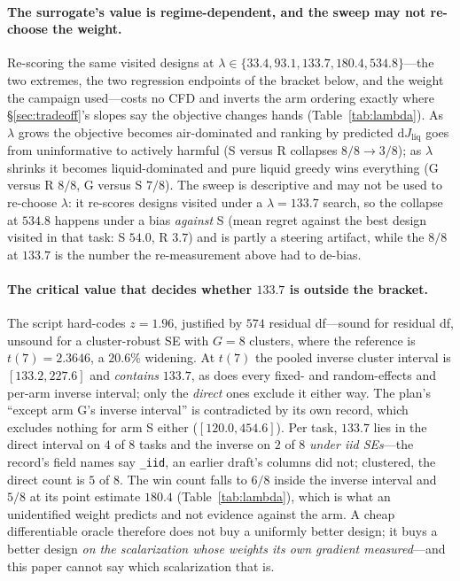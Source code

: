 \documentclass{article}
\newcommand{\Jliq}{J_{\mathrm{liq}}}
\begin{document}
\paragraph{The surrogate's value is regime-dependent, and the sweep may not re-choose the weight.}
Re-scoring the same visited designs at $\lambda \in \{33.4, 93.1, 133.7, 180.4,
534.8\}$---the two extremes, the two regression endpoints of the bracket below, and
the weight the campaign used---costs no CFD and inverts the arm ordering exactly
where \S\ref{sec:tradeoff}'s slopes say the objective changes hands
(Table~\ref{tab:lambda}).  As $\lambda$ grows the objective becomes air-dominated and
ranking by predicted $\mathrm{d}\Jliq$ goes from uninformative to actively harmful
(S versus R collapses $8/8 \to 3/8$); as $\lambda$ shrinks it becomes
liquid-dominated and pure liquid greedy wins everything (G versus R $8/8$, G versus
S $7/8$).  The sweep is descriptive and may not be used to re-choose $\lambda$: it
re-scores designs visited under a $\lambda = 133.7$ search, so the collapse at
$534.8$ happens under a bias \emph{against} S (mean regret against the best design
visited in that task: S $54.0$, R $3.7$) and is partly a steering artifact, while the
$8/8$ at $133.7$ is the number the re-measurement above had to de-bias.

\paragraph{The critical value that decides whether $133.7$ is outside the bracket.}
The script hard-codes $z = 1.96$,
justified by $574$ residual df---sound for residual df, unsound for a cluster-robust SE
with $G = 8$ clusters, where the reference is $t(7) = 2.3646$, a $20.6\%$ widening.  At
$t(7)$ the pooled inverse cluster interval is $[133.2, 227.6]$ and \emph{contains}
$133.7$, as does every fixed- and random-effects and per-arm inverse interval; only the
\emph{direct} ones exclude it either way.  The plan's ``except arm G's inverse interval''
is contradicted by its own record, which excludes nothing for arm S either
($[120.0, 454.6]$).  Per task, $133.7$ lies in the direct interval on $4$ of $8$ tasks and
the inverse on $2$ of $8$ \emph{under iid SEs}---the record's field names say
\texttt{\_iid}, an earlier draft's columns did not; clustered, the direct count is $5$ of
$8$.  The win count falls to $6/8$ inside the inverse interval and $5/8$ at its point
estimate $180.4$ (Table~\ref{tab:lambda}), which is what an unidentified weight predicts
and not evidence against the arm.  A cheap differentiable oracle therefore does not buy a
uniformly better design; it buys a better design \emph{on the scalarization whose weights
its own gradient measured}---and this paper cannot say which scalarization that is.
\end{document}
